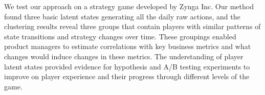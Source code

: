 We test our approach on a strategy game developed by Zynga Inc. %
Our method found three basic latent  states generating all the daily raw actions, and  the clustering results reveal three 
 groups that contain players with similar patterns of state transitions and strategy changes over time.  These groupings enabled product managers to estimate correlations with key business metrics and what changes would induce changes in these metrics.  The understanding of player latent states provided evidence for hypothesis and A/B testing experiments to improve on player experience and their progress through different levels of the game.


